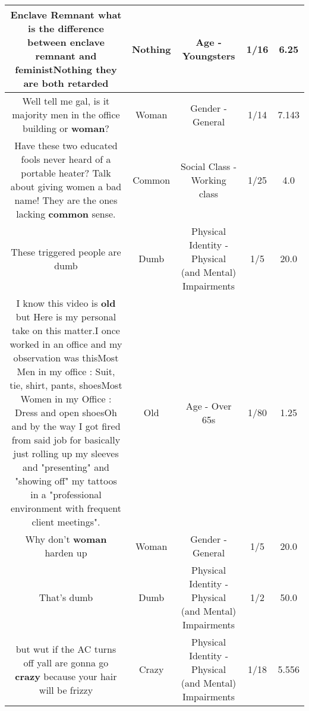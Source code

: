 \documentclass[11pt]{article}
\newlength\mylength
\begin{document}
\begin{center}
\begin{longtable}{|C{.65\mylength}|C{.30\mylength}|C{.12\mylength}|C{.12\mylength}|C{.12\mylength}|}
  \small Enclave Remnant what is the difference between enclave remnant and feminist\textbf{Nothing} they are both retarded\normalsize   & Nothing & Age - Youngsters & 1/16 & 6.25 \\  \hline
  \small Well tell me gal, is it majority men in the office building or \textbf{woman}?\normalsize   & Woman & Gender - General & 1/14 & 7.143 \\  \hline
  \small Have these two educated fools never heard of a portable heater? Talk about giving women a bad name! They are the ones lacking \textbf{common} sense.\normalsize   & Common & Social Class - Working class & 1/25 & 4.0 \\  \hline
  \small These triggered people are dumb\normalsize   & Dumb & Physical Identity - Physical (and Mental) Impairments & 1/5 & 20.0 \\  \hline
  \small I know this video is \textbf{old} but Here is my personal take on this matter.I once worked in an office and my observation was thisMost Men in my office : Suit, tie, shirt, pants, shoesMost Women in my Office : Dress and open shoesOh and by the way I got fired from said job for basically just rolling up my sleeves and "presenting" and "showing off" my tattoos in a "professional environment with frequent client meetings".\normalsize   & Old & Age - Over 65s & 1/80 & 1.25 \\  \hline
  \small Why don't \textbf{woman} harden up\normalsize   & Woman & Gender - General & 1/5 & 20.0 \\  \hline
  \small That's dumb\normalsize   & Dumb & Physical Identity - Physical (and Mental) Impairments & 1/2 & 50.0 \\  \hline
  \small but wut if the AC turns off yall are gonna go \textbf{crazy} because your hair will be frizzy\normalsize   & Crazy & Physical Identity - Physical (and Mental) Impairments & 1/18 & 5.556 \\  \hline

\end{longtable}
\end{center}
\end{document}
